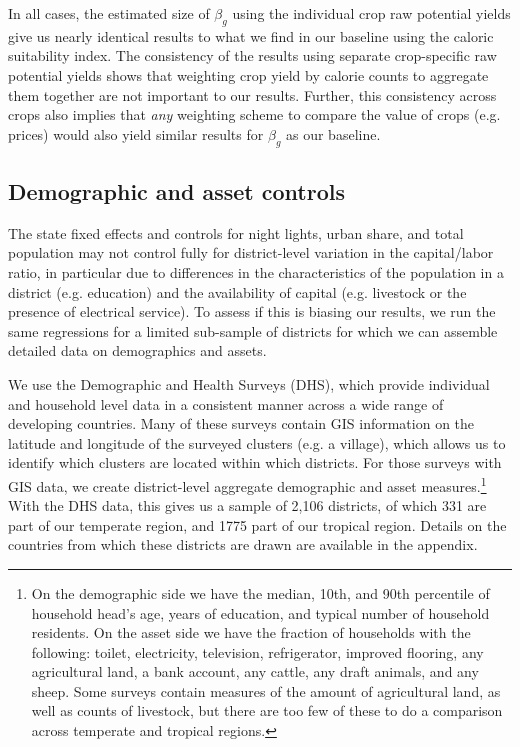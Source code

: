 \documentclass[11pt]{article}
\begin{document}
In all cases, the estimated size of $\beta_g$ using the individual crop raw potential yields give us nearly identical results to what we find in our baseline using the caloric suitability index. The consistency of the results using separate crop-specific raw potential yields shows that weighting crop yield by calorie counts to aggregate them together are not important to our results. Further, this consistency across crops also implies that \textit{any} weighting scheme to compare the value of crops (e.g. prices) would also yield similar results for $\beta_g$ as our baseline. 

\subsection{Demographic and asset controls} 
The state fixed effects and controls for night lights, urban share, and total population may not control fully for district-level variation in the capital/labor ratio, in particular due to differences in the characteristics of the population in a district (e.g. education) and the availability of capital (e.g. livestock or the presence of electrical service). To assess if this is biasing our results, we run the same regressions for a limited sub-sample of districts for which we can assemble detailed data on demographics and assets.

We use the Demographic and Health Surveys (DHS), which provide individual and household level data in a consistent manner across a wide range of developing countries. Many of these surveys contain GIS information on the latitude and longitude of the surveyed clusters (e.g. a village), which allows us to identify which clusters are located within which districts. For those surveys with GIS data, we create district-level aggregate demographic and asset measures.\footnote{On the demographic side we have the median, 10th, and 90th percentile of household head's age, years of education, and typical number of household residents. On the asset side we have the fraction of households with the following: toilet, electricity, television, refrigerator, improved flooring, any agricultural land, a bank account, any cattle, any draft animals, and any sheep. Some surveys contain measures of the amount of agricultural land, as well as counts of livestock, but there are too few of these to do a comparison across temperate and tropical regions.} With the DHS data, this gives us a sample of 2,106 districts, of which 331 are part of our temperate region, and 1775 part of our tropical region. Details on the countries from which these districts are drawn are available in the appendix.
\end{document}
